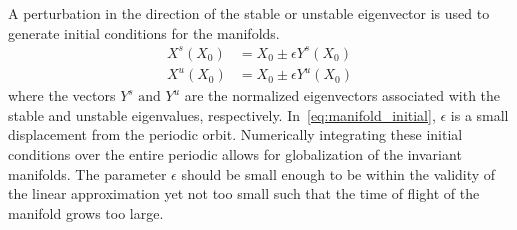A perturbation in the direction of the stable or unstable eigenvector is used to generate initial conditions for the manifolds.
\begin{align}
	X^s(X_0) &= X_0 \pm \epsilon Y^s(X_0) \nonumber \\
	X^u(X_0) &= X_0 \pm \epsilon Y^u(X_0)
	\label{eq:manifold_initial}
\end{align}
where the vectors \(Y^s \text{ and } Y^u \) are the normalized eigenvectors associated with the stable and unstable eigenvalues, respectively.
In~\eqref{eq:manifold_initial}, \( \epsilon \) is a small displacement from the periodic orbit. 
Numerically integrating these initial conditions over the entire periodic allows for globalization of the invariant manifolds.
The parameter \(\epsilon\) should be small enough to be within the validity of the linear approximation yet not too small such that the time of flight of the manifold grows too large.
